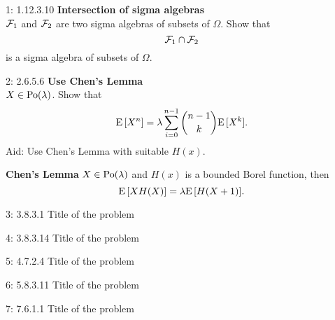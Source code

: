 \documentclass[a4paper,twoside=false,abstract=false,numbers=noenddot,
titlepage=false,headings=small,parskip=half,version=last]{scrartcl}
\begin{document}

\begin{exercise}{1: 1.12.3.10} {\bf Intersection of sigma algebras}   \\
    $\mathcal{F}_1$ and $\mathcal{F}_2$ are two sigma algebras of subsets of $\Omega$. Show
    that
    \begin{equation*}
        \mathcal{F}_1 \cap \mathcal{F}_2
    \end{equation*}
    is a sigma algebra of subsets of $\Omega$.
\end{exercise}
\begin{solution}
\end{solution}

\begin{exercise}{2: 2.6.5.6} {\bf Use Chen's Lemma} \\
    $X \in \text{Po}(\lambda)$. Show that
    \begin{equation}
        {\rm E}\,[X^n] =
        \lambda \sum\limits_{i=0}^{n-1} \binom{n-1}{k}{\rm E}\,[X^k].
    \end{equation}
    Aid: Use Chen's Lemma with suitable $H(x)$.
\end{exercise}
\begin{solution}
    \begin{lemma}
        \label{lemma:chen}  %
        {\bf Chen's Lemma} $X \in \text{Po}(\lambda)$ and $H(x)$ is a bounded
        Borel function, then
        \begin{equation*}
            {\rm E}\,[XH(X)] = \lambda{\rm E}\,[H(X+1)].
        \end{equation*}
    \end{lemma}
\end{solution}

\begin{exercise}{3: 3.8.3.1} Title of the problem \\
\end{exercise}
\begin{solution}
\end{solution}

\begin{exercise}{4: 3.8.3.14} Title of the problem \\
\end{exercise}
\begin{solution}
\end{solution}

\begin{exercise}{5: 4.7.2.4} Title of the problem \\
\end{exercise}
\begin{solution}
\end{solution}

\begin{exercise}{6: 5.8.3.11} Title of the problem \\
\end{exercise}
\begin{solution}
\end{solution}

\begin{exercise}{7: 7.6.1.1} Title of the problem \\
\end{exercise}
\begin{solution}
\end{solution}
\end{document}
